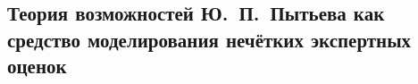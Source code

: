\subsection{Теория возможностей Ю.~П.~Пытьева как средство моделирования нечётких экспертных оценок}
\label{sec:math_methods_ours}
\begin{comment}
Т.\,в. Ю.~П.~Пытьева построена аксиоматически, аналогично построению теории вероятностей \cite{4,8}. Пусть имеется множество элементарных исходов $\Om$ и задана $\sigma$-алгебра событий $\Alg \subseteq 2^{\Om}$. Возможностью называется всякая измеримая функция $\P(\cdot): \Alg \rightarrow \zo$, обладающая определенными свойствами, которые будут определены ниже. Тройка $\OAP$ называется пространством с возможностью. 

Определим шкалу $\scL$ значений возможности $\P(\cdot)$ как интервал $\zo$ с естественной упорядоченностью $\leqslant$ и двумя бинарными операциями, $\plus: \zo \times \zo \rightarrow \zo$ и $\mult: \zo \times \zo \rightarrow \zo$. С точки зрения эксперта, $\scL$ --- это правила, по которым он размещает возможности событий из $\Alg$ на отрезке $\zo$. 

Пусть $\Gamma$ --- группа строго монотонно возрастающих непрерывных $\gamma(\cdot): \zo \rightarrow \zo,\ \gamma(0)=0,\ \gamma(1)=1$ с групповой операцией $\circ: f \circ g = f(g(\cdot))$. Возможности $\P$ и $\P'$ назовем {\sl эквивалентными}, если $\P' = \gamma(\P)$. Эквивалентные возможности образуют класс возможностей $\PP$ и соотвествующий класс пространств с возможностью \{$\OAP\ |\ \P \in \PP $\}. Принцип относительности (см. \cite{8}) гласит, что утверждения и модели, полученные с использованием возможности, содержательны в том и только в том случае, если они остаются верными при замене данной возможности $\P$ на любую эквивалентную ей $\P'$. 

Из принципа относительности следует, что операции $\plus$ и $\mult$ над значениями возможностей двух произвольных множеств $A, B \in \Alg$, т.е. числами $a = \P(A) \in \zo, b = \P(B) \in \zo$, должны удовлетворять условиям:
\begin{center}
  $\gamma(a \plus b) = \gamma(a) \plus \gamma(b),\ $
  $\gamma(a \mult b) = \gamma(a) \mult \gamma(b) $
\end{center}
Также эти операции должны быть коммутативны и не выводить за пределы $\zo$:
\begin{center}
  $a \plus b = b \plus a,\ a \plus 1 = 1,\ a \plus 0 = a, $\\
  $a \mult b = b \mult a,\ a \mult 1 = a,\ a \mult 0 = 0, $
\end{center}
В \cite{8} показано, что единственный способ получить все эти свойства в классе непрерывных операций --- определить
\begin{equation*}
 a \plus b \defeq \sup\{a,b\}; \ \  a \mult b \defeq \inf\{a,b\} 
\end{equation*}
Эти операции естественным образом распространяются на конечное или счётное число операндов. 


\end{comment}
